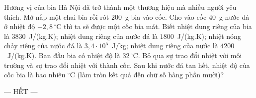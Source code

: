 	\begin{ex}%
		Hương vị của bia Hà Nội đã trở thành một thương hiệu mà nhiều người yêu thích. Mở nắp một chai bia rồi rót $200$~g bia vào cốc. Cho vào cốc $40$~g nước đá ở nhiệt độ $-2{,}8\,^\circ\text{C}$ thì ta sẽ được một cốc bia mát. Biết nhiệt dung riêng của bia là $3830$~J/(kg.K); nhiệt dung riêng của nước đá là $1800$~J/(kg.K); nhiệt nóng chảy riêng của nước đá là $3{,}4\cdot 10^5$~J/kg; nhiệt dung riêng của nước là $4200$~J/(kg.K). Ban đầu bia có nhiệt độ là $32\,^\circ\text{C}$. Bỏ qua sự trao đổi nhiệt với môi trường và sự trao đổi nhiệt với thành cốc. Sau khi nước đá tan hết, nhiệt độ của cốc bia là bao nhiêu $^\circ$C (làm tròn kết quả đến chữ số hàng phần mười)?
		\par
	\end{ex}

	\centerline{--- HẾT ---}



